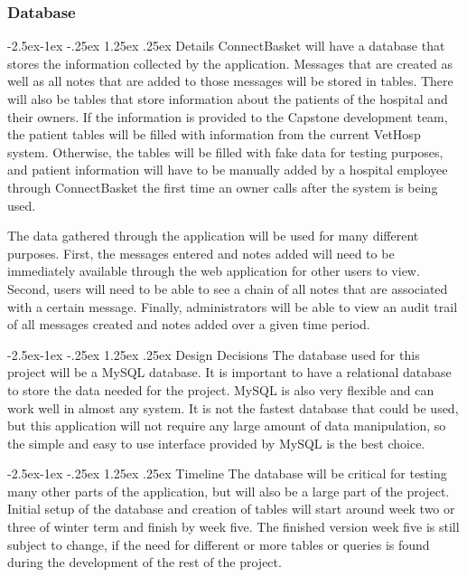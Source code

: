 \documentclass[onecolumn, draftclsnofoot,10pt, compsoc]{IEEEtran}
\makeatletter
\renewcommand\paragraph{\@startsection{paragraph}{4}{\z@}%
            {-2.5ex\@plus -1ex \@minus -.25ex}%
            {1.25ex \@plus .25ex}%
            {\normalfont\normalsize\bfseries}}
\makeatother
\begin{document}
\subsubsection{Database}

\paragraph{Details}
ConnectBasket will have a database that stores the information collected by the application. Messages that are created as well as all notes that are added to those messages will be stored in tables. There will also be tables that store information about the patients of the hospital and their owners. If the information is provided to the Capstone development team, the patient tables will be filled with information from the current VetHosp system. Otherwise, the tables will be filled with fake data for testing purposes, and patient information will have to be manually added by a hospital employee through ConnectBasket the first time an owner calls after the system is being used.

The data gathered through the application will be used for many different purposes. First, the messages entered and notes added will need to be immediately available through the web application for other users to view. Second, users will need to be able to see a chain of all notes that are associated with a certain message. Finally, administrators will be able to view an audit trail of all messages created and notes added over a given time period.


\paragraph{Design Decisions}
The database used for this project will be a MySQL database. It is important to have a relational database to store the data needed for the project. MySQL is also very flexible and can work well in almost any system. It is not the fastest database that could be used, but this application will not require any large amount of data manipulation, so the simple and easy to use interface provided by MySQL is the best choice\cite{mysql}.

\paragraph{Timeline}
The database will be critical for testing many other parts of the application, but will also be a large part of the project. Initial setup of the database and creation of tables will start around week two or three of winter term and finish by week five. The finished version week five is still subject to change, if the need for different or more tables or queries is found during the development of the rest of the project.
\end{document}
